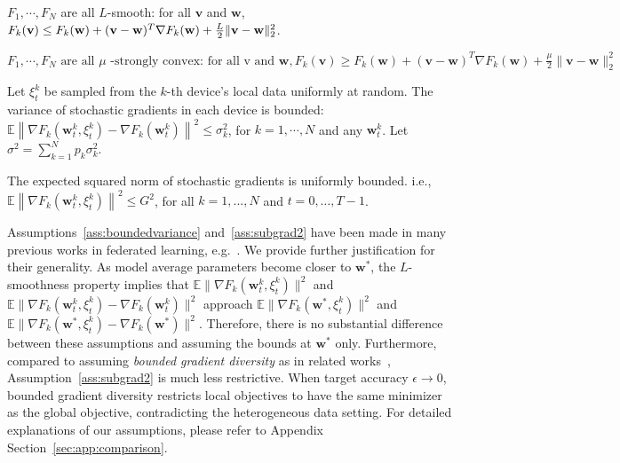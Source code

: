 
\begin{assumption}[L-smooth]
	$F_{1}, \cdots, F_{N}$ are all $L$-smooth: for all  $\mathbf{v}$  and $\mathbf{w}$, $F_{k}(\mathbf{v}) \leq F_{k}(\mathbf{w})+(\mathbf{v}- \\ \mathbf{w})^{T} \nabla F_{k}(\mathbf{w})+\frac{L}{2}\|\mathbf{v}-\mathbf{w}\|_{2}^{2}$.
	\label{ass:lsmooth}
\end{assumption}
\begin{assumption}
	$	F_{1}, \cdots, F_{N} \text { are all } \mu \text { -strongly convex: for all v and } \mathbf{w}, F_{k}(\mathbf{v}) \geq F_{k}(\mathbf{w})+(\mathbf{v}-\mathbf{w})^{T} \nabla F_{k}(\mathbf{w})+\frac{\mu}{2}\|\mathbf{v}-\mathbf{w}\|_{2}^{2}$
	\label{ass:stroncvx}
\end{assumption}
\begin{assumption}
	Let $\xi_{t}^{k}$ be sampled from the $k$-th device's local data uniformly at random. The variance of stochastic gradients in each device is bounded: $\mathbb{E}\left\|\nabla F_{k}\left(\mathbf{w}_{t}^{k}, \xi_{t}^{k}\right)-\nabla F_{k}\left(\mathbf{w}_{t}^{k}\right)\right\|^{2} \leq \sigma_{k}^{2}$,
	for $k=1, \cdots, N$ and any $\mathbf{w}_{t}^{k}$. Let $\sigma^2=\sum_{k=1}^{N}p_k\sigma_{k}^{2}$.
	\label{ass:boundedvariance}
\end{assumption}
\begin{assumption}
	The expected squared norm of stochastic gradients is uniformly bounded. i.e.,
	$\mathbb{E}\left\|\nabla F_{k}\left(\mathbf{w}_{t}^{k}, \xi_{t}^{k}\right)\right\|^{2} \leq G^{2}$, for all $k = 1,..., N$ and $t=0, \dots, T-1$.
	\label{ass:subgrad2}
\end{assumption}
Assumptions~\ref{ass:boundedvariance} and~\ref{ass:subgrad2} have been made in many previous
works in federated learning, e.g.~\cite{yu2019parallel,li2019convergence,stich2018local}. We provide further justification for their generality. As model average parameters become
closer to $\mathbf{w}^{\ast}$, the $L$-smoothness property implies
that $\mathbb{E}\|\nabla F_{k}(\mathbf{w}_{t}^{k},\xi_{t}^{k})\|^{2}$
and $\mathbb{E}\|\nabla F_{k}(\mathbf{w}_{t}^{k},\xi_{t}^{k})-\nabla F_{k}(\mathbf{w}_{t}^{k})\|^{2}$
approach $\mathbb{E}\|\nabla F_{k}(\mathbf{w}^{\ast},\xi_{t}^{k})\|^{2}$
and $\mathbb{E}\|\nabla F_{k}(\mathbf{w}^{\ast},\xi_{t}^{k})-\nabla F_{k}(\mathbf{w}^{\ast})\|^{2}$.
Therefore, there is no substantial difference between these assumptions
and assuming the bounds at $\mathbf{w}^{\ast}$ only. Furthermore, compared to assuming \textit{bounded gradient diversity} as in related works~\cite{haddadpour2019convergence,li2018federated}, Assumption~\ref{ass:subgrad2} is much less restrictive. When target accuracy $\epsilon \rightarrow 0$,
bounded gradient diversity restricts local objectives to have the same minimizer as the global objective, contradicting the heterogeneous data setting. 
For detailed explanations of our assumptions, please refer to Appendix Section~\ref{sec:app:comparison}.


